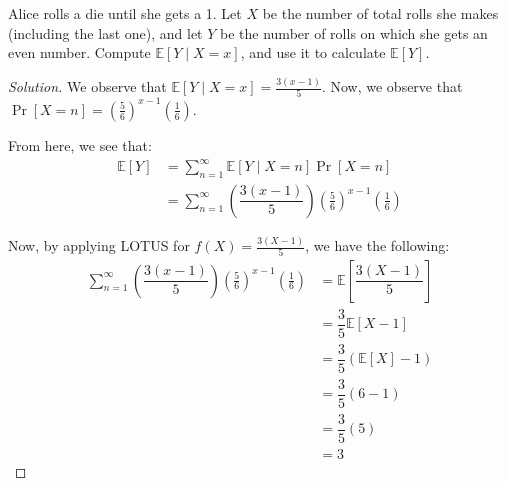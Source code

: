 \documentclass{article}
\newenvironment{solution}{\begin{proof}[Solution]}{\end{proof}}
\newcommand{\E}{\mathbb{E}}
\let\oldsum\sum
\renewcommand{\sum}[2]{\oldsum\limits_{#1}^{#2}}
\begin{document}
\begin{hw}
	Alice rolls a die until she gets a 1. Let $X$ be the number of total rolls she makes (including the last one), and let $Y$ be the number of rolls on which she gets an even number. Compute $\E[Y \mid X = x]$, and use it to calculate $\E[Y]$. 
\end{hw}
\begin{solution}
	We observe that $\E[Y \mid X = x] = \frac{3(x-1)}{5}$. Now, we observe that $\Pr[X = n] = \left( \frac{5}{6} \right)^{x-1}\left( \frac{1}{6} \right)$.
	
	From here, we see that:
	\begin{align*}
		\E[Y] &= \sum{n=1}{\infty} \E[Y \mid X = n] \Pr[X = n] \\
		&= \sum{n=1}{\infty} \left( \dfrac{3(x-1)}{5} \right) \left( \frac{5}{6} \right)^{x-1}\left( \frac{1}{6} \right)
	\end{align*}

	Now, by applying LOTUS for $f(X) = \frac{3(X-1)}{5}$, we have the following:
	\begin{align*}
		\sum{n=1}{\infty} \left( \dfrac{3(x-1)}{5} \right) \left( \frac{5}{6} \right)^{x-1}\left( \frac{1}{6} \right) &= \E\left[ \dfrac{3(X-1)}{5} \right] \\
		&= \dfrac{3}{5}\E[X-1] \\
		&= \dfrac{3}{5}\left( \E[X] - 1 \right) \\
		&= \dfrac{3}{5}\left( 6 - 1 \right) \\
		&= \dfrac{3}{5}(5) \\
		&= 3
	\end{align*}
\end{solution}
\end{document}
